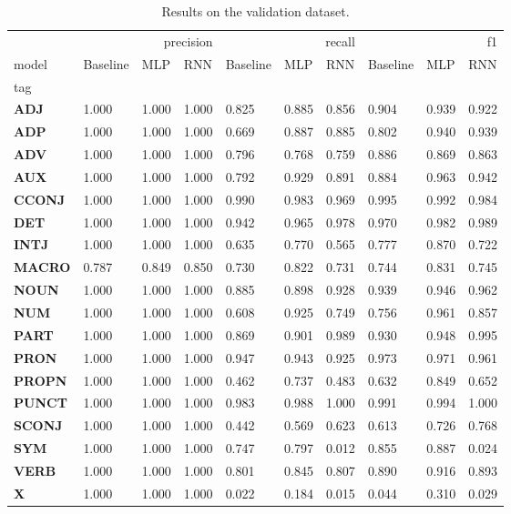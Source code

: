 \begin{table}
\caption{Results on the validation dataset.}
\label{tab::ex_2_valid}
\begin{tabular}{|l||l||l||l||l||l||l||l||l||l|}
\toprule
 & \multicolumn{3}{r}{precision} & \multicolumn{3}{r}{recall} & \multicolumn{3}{r}{f1} \\
model & Baseline & MLP & RNN & Baseline & MLP & RNN & Baseline & MLP & RNN \\
tag &  &  &  &  &  &  &  &  &  \\
\midrule
\textbf{ADJ} & 1.000 & 1.000 & 1.000 & 0.825 & 0.885 & 0.856 & 0.904 & 0.939 & 0.922 \\
\textbf{ADP} & 1.000 & 1.000 & 1.000 & 0.669 & 0.887 & 0.885 & 0.802 & 0.940 & 0.939 \\
\textbf{ADV} & 1.000 & 1.000 & 1.000 & 0.796 & 0.768 & 0.759 & 0.886 & 0.869 & 0.863 \\
\textbf{AUX} & 1.000 & 1.000 & 1.000 & 0.792 & 0.929 & 0.891 & 0.884 & 0.963 & 0.942 \\
\textbf{CCONJ} & 1.000 & 1.000 & 1.000 & 0.990 & 0.983 & 0.969 & 0.995 & 0.992 & 0.984 \\
\textbf{DET} & 1.000 & 1.000 & 1.000 & 0.942 & 0.965 & 0.978 & 0.970 & 0.982 & 0.989 \\
\textbf{INTJ} & 1.000 & 1.000 & 1.000 & 0.635 & 0.770 & 0.565 & 0.777 & 0.870 & 0.722 \\
\textbf{MACRO} & 0.787 & 0.849 & 0.850 & 0.730 & 0.822 & 0.731 & 0.744 & 0.831 & 0.745 \\
\textbf{NOUN} & 1.000 & 1.000 & 1.000 & 0.885 & 0.898 & 0.928 & 0.939 & 0.946 & 0.962 \\
\textbf{NUM} & 1.000 & 1.000 & 1.000 & 0.608 & 0.925 & 0.749 & 0.756 & 0.961 & 0.857 \\
\textbf{PART} & 1.000 & 1.000 & 1.000 & 0.869 & 0.901 & 0.989 & 0.930 & 0.948 & 0.995 \\
\textbf{PRON} & 1.000 & 1.000 & 1.000 & 0.947 & 0.943 & 0.925 & 0.973 & 0.971 & 0.961 \\
\textbf{PROPN} & 1.000 & 1.000 & 1.000 & 0.462 & 0.737 & 0.483 & 0.632 & 0.849 & 0.652 \\
\textbf{PUNCT} & 1.000 & 1.000 & 1.000 & 0.983 & 0.988 & 1.000 & 0.991 & 0.994 & 1.000 \\
\textbf{SCONJ} & 1.000 & 1.000 & 1.000 & 0.442 & 0.569 & 0.623 & 0.613 & 0.726 & 0.768 \\
\textbf{SYM} & 1.000 & 1.000 & 1.000 & 0.747 & 0.797 & 0.012 & 0.855 & 0.887 & 0.024 \\
\textbf{VERB} & 1.000 & 1.000 & 1.000 & 0.801 & 0.845 & 0.807 & 0.890 & 0.916 & 0.893 \\
\textbf{X} & 1.000 & 1.000 & 1.000 & 0.022 & 0.184 & 0.015 & 0.044 & 0.310 & 0.029 \\
\bottomrule
\end{tabular}
\end{table}
